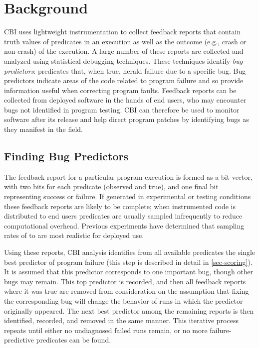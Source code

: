 
\section{Background}
\label{sec-bground}
CBI uses lightweight instrumentation to collect feedback reports that contain truth values of predicates in an execution as well as the outcome (e.g., crash or non-crash) of the execution.  A large number of these reports are collected and analyzed using statistical debugging techniques.  These techniques identify \emph{bug predictors}: predicates that, when true, herald failure due to a specific bug.  Bug predictors indicate areas of the code related to program failure and so provide information useful when correcting program faults.  Feedback reports can be collected from deployed software in the hands of end users, who may encounter bugs not identified in program testing.  CBI can therefore be used to monitor software after its release and help direct program patches by identifying bugs as they manifest in the field.

\subsection{Finding Bug Predictors}
\label{sec-elimalg}
The feedback report for a particular program execution is formed as a bit-vector, with two bits for each predicate (observed and true), and one final bit representing success or failure.  If generated in experimental or testing conditions these feedback reports are likely to be complete; when instrumented code is distributed to end users predicates are usually sampled infrequently to reduce computational overhead.  Previous experiments \cite{Liblit:2003:BIRPS} have determined that sampling rates of  to  are most realistic for deployed use.

Using these reports, CBI analysis identifies from all available predicates the single best predictor of program failure (this step is described in detail in \autoref{sec-scoring}).  It is assumed that this predictor corresponds to one important bug, though other bugs may remain.    This top predictor is recorded, and then all feedback reports where it was true are removed from consideration on the assumption that fixing the corresponding bug will change the behavior of runs in which the predictor originally appeared.  The next best predictor among the remaining reports is then identified, recorded, and removed in the same manner.  This iterative process repeats until either no undiagnosed failed runs remain, or no more failure-predictive predicates can be found.

